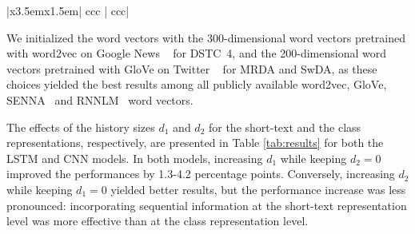\documentclass[11pt,letterpaper]{article}
\begin{document}
\begin{table*} [ht]
\begin{tabular}{|x{3.5em}x{1.5em}| ccc | ccc|}
\hline
\end{tabular}
\renewcommand\thetable{3}
\caption{Accuracy (\%) on different architectures and history sizes $d_1, d_2$. For each setting, we report average (minimum, maximum) computed on 5 runs. 
Sequential classification ($d_1 + d_2 > 0$) outperforms non-sequential classification ($d_1 = d_2 = 0$).
Overall, the CNN model outperformed the LSTM model for all datasets, albeit by a small margin except for SwDA. We also tried a variant of the LSTM model, gated recurrent units~\protect\cite{cho2014properties}, but the results were generally lower than LSTM.\vspace{-0.2cm}} \label{tab:results}
\end{table*}








































 We initialized the word vectors with the 300-dimensional word vectors pretrained with word2vec on Google News
~\cite{mikolov2013efficient,mikolov2013distributed} for DSTC~4, and the 200-dimensional word vectors pretrained with GloVe on Twitter
~\cite{pennington2014glove} for MRDA and SwDA, as these choices yielded the best results among all publicly available word2vec, GloVe, SENNA~\cite{collobert2011deep,collobert2011natural} and RNNLM~\cite{mikolov2011rnnlm} word vectors.









The effects of the history sizes $d_1$ and $d_2$ for the short-text and the class representations, respectively,
are presented in Table \ref{tab:results} for both the LSTM and CNN models. In both models, increasing $d_1$  while keeping $d_2 = 0$
improved the performances by 1.3-4.2 percentage points. Conversely, increasing $d_2$ while keeping $d_1 = 0$ yielded better results, but the performance increase was less pronounced:
incorporating sequential information at the short-text representation level was more effective than at the class representation level. 
\end{document}
